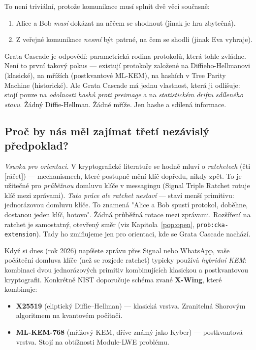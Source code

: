 \documentclass[11pt,a4paper]{article}
\begin{document}
To není triviální, protože komunikace musí splnit dvě věci současně:
\begin{enumerate}[leftmargin=*]
\item Alice a Bob \emph{musí} dokázat na něčem se shodnout (jinak je hra zbytečná).
\item Z veřejné komunikace \emph{nesmí} být patrné, na čem se shodli (jinak Eva vyhraje).
\end{enumerate}

Grata Cascade je odpovědí: parametrická rodina protokolů, která tohle zvládne. Není to první takový pokus --- existují protokoly založené na Diffieho-Hellmanovi (klasické), na mřížích (postkvantové ML-KEM), na hashích v Tree Parity Machine (historické). Ale Grata Cascade má jednu vlastnost, která ji odlišuje: stojí pouze na \emph{odolnosti hashů proti preimage} a na \emph{statistickém driftu sdíleného stavu}. Žádný Diffie-Hellman. Žádné mříže. Jen hashe a sdílená informace.

\subsection{Proč by nás měl zajímat třetí nezávislý předpoklad?}\label{pop:why-third-assumption}

\noindent\emph{Vsuvka pro orientaci.} V kryptografické literatuře se hodně mluví o \emph{ratchetech} (čti [ráčet]) --- mechanismech, které postupně mění klíč dopředu, nikdy zpět. To je užitečné pro \emph{průběžnou} domluvu klíče v messagingu (Signal Triple Ratchet rotuje klíč mezi zprávami). \emph{Tato práce ale ratchet nestaví} --- staví menší primitivu: jednorázovou domluvu klíče. To znamená "Alice a Bob spustí protokol, doběhne, dostanou jeden klíč, hotovo". Žádná průběžná rotace mezi zprávami. Rozšíření na ratchet je samostatný, otevřený směr (viz Kapitola~\ref{pop:open}, \texttt{prob:cka-extension}). Tady ho zmiňujeme jen pro orientaci, kde se Grata Cascade nachází.

\medskip
Když si dnes (rok 2026) napíšete zprávu přes Signal nebo WhatsApp, vaše počáteční domluva klíče (než se rozjede ratchet) typicky používá \emph{hybridní KEM}: kombinaci dvou jednorázových primitiv kombinujících klasickou a postkvantovou kryptografii. Konkrétně NIST doporučuje schéma zvané \textbf{X-Wing}, které kombinuje:

\begin{itemize}[leftmargin=*]
\item \textbf{X25519} (eliptický Diffie--Hellman) --- klasická vrstva. Zranitelná Shorovým algoritmem na kvantovém počítači.
\item \textbf{ML-KEM-768} (mřížový KEM, dříve známý jako Kyber) --- postkvantová vrstva. Stojí na obtížnosti Module-LWE problému.
\end{itemize}
\end{document}
